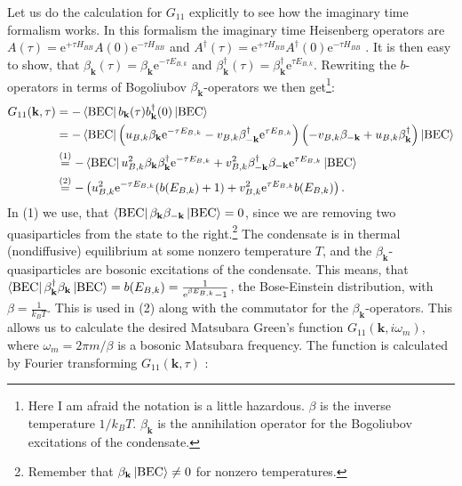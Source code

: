 Let us do the calculation for $G_{11}$ explicitly to see how the imaginary time formalism works. In this formalism the imaginary time Heisenberg operators are $A(\tau) = \text{e}^{+\tau H_{BB}}A(0)\text{e}^{-\tau H_{BB}}$ and $A^\dagger(\tau) = \text{e}^{+\tau H_{BB}}A^\dagger(0)\text{e}^{-\tau H_{BB}}$ \cite[p. 185]{BruusFlensberg}. It is then easy to show, that $\beta_\mathbf{k}(\tau) = \beta_\mathbf{k}\text{e}^{-\tau E_{B,k}}$ and $\beta^\dagger_\mathbf{k}(\tau) = \beta^\dagger_\mathbf{k}\text{e}^{\tau E_{B,k}}$. Rewriting the $b$-operators in terms of Bogoliubov $\beta_\mathbf{k}$-operators we then get\footnote{Here I am afraid the notation is a little hazardous. $\beta$ is the inverse temperature $1/k_BT$. $\beta_\mathbf{k}$ is the annihilation operator for the Bogoliubov excitations of the condensate.}:
\begin{align}
G_{11}(\mathbf{k},\tau) &= -\bra{\text{BEC}} b_\mathbf{k}(\tau)b_\mathbf{k}^\dagger(0)\ket{\text{BEC}} \nonumber \\
&= -\bra{\text{BEC}} \left(u_{B,k}\beta_\mathbf{k}\text{e}^{-\tau E_{B,k}} - v_{B,k} \beta^\dagger_{-\mathbf{k}}\text{e}^{\tau E_{B,k}} \right)\left( -v_{B,k}\beta_{-\mathbf{k}} + u_{B,k} \beta^\dagger_{\mathbf{k}} \right)\ket{\text{BEC}} \nonumber \\
&\overset{(1)}{=} -\bra{\text{BEC}} u_{B,k}^2\beta_\mathbf{k}\beta^\dagger_\mathbf{k}\text{e}^{-\tau E_{B,k}} + v_{B,k}^2 \beta^\dagger_{-\mathbf{k}}\beta_{-\mathbf{k}}\text{e}^{\tau E_{B,k}} \ket{\text{BEC}} \nonumber \\
&\overset{(2)}{=} -\left(u_{B,k}^2 \text{e}^{-\tau E_{B,k}}(b(E_{B,k})+1)+ v_{B,k}^2\text{e}^{\tau E_{B,k}}b(E_{B,k})\right). \nonumber
\end{align}
In (1) we use, that $\bra{\text{BEC}}\beta_\mathbf{k}\beta_{-\mathbf{k}}\ket{\text{BEC}} = 0$, since we are removing two quasiparticles from the state to the right.\footnote{Remember that $\beta_\mathbf{k}\ket{\text{BEC}} \neq 0$ for nonzero temperatures.} The condensate is in thermal (nondiffusive) equilibrium at some nonzero temperature $T$, and the $\beta_\mathbf{k}$-quasiparticles are bosonic excitations of the condensate. This means, that $\bra{\text{BEC}}\beta_\mathbf{k}^\dagger\beta_{\mathbf{k}}\ket{\text{BEC}} = b(E_{B,k}) = \frac{1}{\text{e}^{\beta E_{B,k}}-1}$, the Bose-Einstein distribution, with $\beta = \frac{1}{k_BT}$. This is used in (2) along with the commutator for the $\beta_\mathbf{k}$-operators. This allows us to calculate the desired Matsubara Green's function $G_{11}(\mathbf{k},i\omega_m)$, where $\omega_m = 2\pi m/\beta$ is a bosonic Matsubara frequency. The function is calculated by Fourier transforming $G_{11}(\mathbf{k},\tau)$ \cite[p. 187-189]{BruusFlensberg}: 
